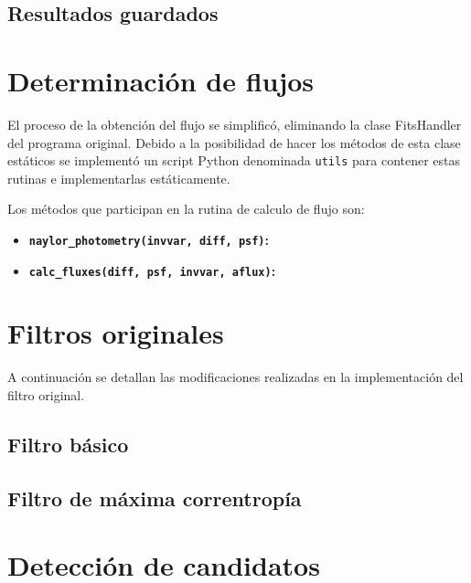 \subsection{Resultados guardados}
\section{Determinaci\'on de flujos}
El proceso de la obtenci\'on del flujo se simplific\'o, eliminando la clase FitsHandler del programa original. Debido a la posibilidad de hacer los m\'etodos de esta clase est\'aticos se implement\'o un script Python denominada \texttt{utils} para contener estas rutinas e implementarlas est\'aticamente.
\bigskip

Los m\'etodos que participan en la rutina de calculo de flujo son: 

\begin{itemize}
\item \textbf{\texttt{naylor\_photometry(invvar, diff, psf)}:}
\item \textbf{\texttt{calc\_fluxes(diff, psf, invvar, aflux)}:}
\end{itemize} 
\section{Filtros originales}
A continuaci\'on se detallan las modificaciones realizadas en la implementaci\'on del filtro original.
\subsection{Filtro b\'asico}
\subsection{Filtro de m\'axima correntrop\'ia}
\section{Detecci\'on de candidatos}
